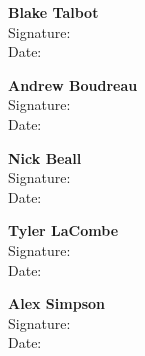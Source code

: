 \documentclass[12pt]{article}
\begin{document}
\doublespacing 
\begin{figure}[!h]
\begin{minipage}{0.45\textwidth}
\begin{flushleft}
{\bf Blake Talbot}\\
\vspace{.3in}
Signature:\hrulefill \\
\vspace{.3in}
Date: \hrulefill \\
\end{flushleft}
\end{minipage}
\hspace{0.08\textwidth}
\begin{minipage}{0.45\textwidth}
\begin{flushleft}
{\bf Andrew Boudreau} \\
\vspace{.3in}
Signature:\hrulefill \\
\vspace{.3in}
Date: \hrulefill \\
\end{flushleft}
\end{minipage}
\end{figure}
%
\vspace{0.6in}
\begin{figure}[!h]
\begin{minipage}{0.45\textwidth}
\begin{flushleft}
{\bf Nick Beall} \\
\vspace{.3in}
Signature:\hrulefill \\
\vspace{.3in}
Date: \hrulefill \\
\end{flushleft}
\end{minipage}
\hspace{0.08\textwidth}
\begin{minipage}{0.45\textwidth}
\begin{flushleft}
{\bf Tyler LaCombe} \\
\vspace{.3in}
Signature:\hrulefill \\
\vspace{.3in}
Date: \hrulefill \\
\end{flushleft}
\end{minipage}
\end{figure}
\vspace{0.6in}
\begin{figure}[!h]
\begin{minipage}{0.45\textwidth}
\begin{flushleft}
{\bf Alex Simpson} \\
\vspace{.3in}
Signature:\hrulefill \\
\vspace{.3in}
Date: \hrulefill \\
\end{flushleft}
\end{minipage}
\end{figure}
\end{document}
